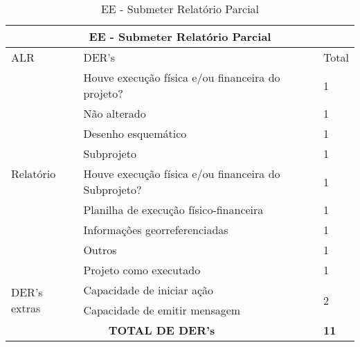\begin{table}[!h]
\centering
\caption{EE - Submeter Relatório Parcial}
\label{ee_submeter_relatorio_parcial}
\begin{tabular}{|l|l|l|}
\hline
\multicolumn{3}{|c|}{EE - Submeter Relatório Parcial}                                                                 \\ \hline
ALR                           & DER's                                                & Total              \\ \hline
\multirow{9}{*}{Relatório}    & Houve execução física e/ou financeira do projeto?    & 1                  \\ \cline{2-3} 
                              & Não alterado                                         & 1                  \\ \cline{2-3} 
                              & Desenho esquemático                                  & 1                  \\ \cline{2-3} 
                              & Subprojeto                                           & 1                  \\ \cline{2-3} 
                              & Houve execução física e/ou financeira do Subprojeto? & 1                  \\ \cline{2-3} 
                              & Planilha de execução físico-financeira               & 1                  \\ \cline{2-3} 
                              & Informações georreferenciadas                        & 1                  \\ \cline{2-3} 
                              & Outros                                               & 1                  \\ \cline{2-3} 
                              & Projeto como executado                               & 1                  \\ \hline
\multirow{2}{*}{DER's extras} & Capacidade de iniciar ação                           & \multirow{2}{*}{2} \\ \cline{2-2}
                              & Capacidade de emitir mensagem                        &                    \\ \hline
\multicolumn{2}{|c|}{\textbf{TOTAL DE DER's}}                                                 & \textbf{11}                 \\ \hline
\end{tabular}
\end{table}


